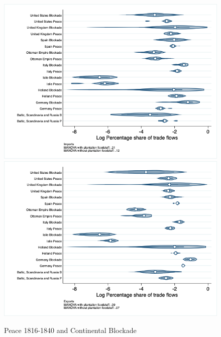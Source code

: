 \documentclass[12pt,a4paper,notitlepage,english]{article}
\begin{document}
\begin{figure}
\centering
\caption{Peace 1816-1840 and Continental Blockade}
\label{peace1816_1840_block_nat_distr_pays7}
\includegraphics[scale=.4]{peace1816_1840_block_nat_distr_Ipays7}
\includegraphics[scale=.4]{peace1816_1840_block_nat_distr_Xpays7}
\end{figure}
\end{document}

